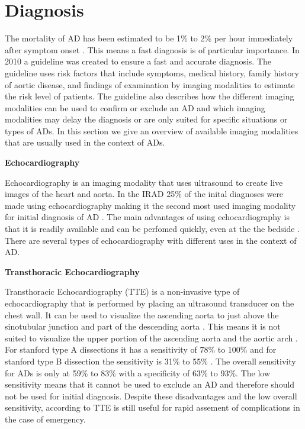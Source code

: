 \documentclass[thesis.tex]{subfiles}
\begin{document}
\section{Diagnosis}

The mortality of AD has been estimated to be 1\% to 2\% per hour immediately after symptom onset \cite{doi:10.1161/CIRCULATIONAHA.117.031264,meszaros2000epidemiology,goldfinger2014thoracic}. This means a fast diagnosis is of particular importance. In 2010 a guideline was created \cite{hiratzka20102010} to ensure a fast and accurate diagnosis. The guideline uses risk factors that include symptoms, medical history, family history of aortic disease, and findings of examination by imaging modalities to estimate the risk level of patients. The guideline also describes how the different imaging modalities can be used to confirm or exclude an AD and which imaging modalities may delay the diagnosis or are only suited for specific situations or types of ADs. In this section we give an overview of available imaging modalities that are usually used in the context of ADs.

\textbf{Echocardiography}

Echocardiography is an imaging modality that uses ultrasound to create live images of the heart and aorta. In the IRAD 25\% of the inital diagnoses were made using echocardiography making it the second most used imaging modality for initial diagnosis of AD \cite{doi:10.1161/CIRCULATIONAHA.117.031264}. The main advantages of using echocardiography is that it is readily available and can be perfomed quickly, even at the the bedside \cite{baliga2014role}. There are several types of echocardiography with different uses in the context of AD.

\textbf{Transthoracic Echocardiography}

Transthoracic Echocardiography (TTE) is a non-invasive type of echocardiography that is performed by placing an ultrasound transducer on the chest wall. It can be used to visualize the ascending aorta to just above the sinotubular junction and part of the descending aorta \cite{baliga2014role}. This means it is not suited to visualize the upper portion of the ascending aorta and the aortic arch \cite{baliga2014role}. For stanford type A dissections it has a sensitivity of 78\% to 100\% and for stanford type B dissection the sensitivity is 31\% to 55\% \cite{baliga2014role}. The overall sensitivity for ADs is only at 59\% to 83\% with a specificity of 63\% to 93\%. The low sensitivity means that it cannot be used to exclude an AD and therefore should not be used for initial diagnosis. Despite these disadvantages and the low overall sensitivity, according to \cite{baliga2014role} TTE is still useful for rapid assement of complications in the case of emergency. 
\end{document}
